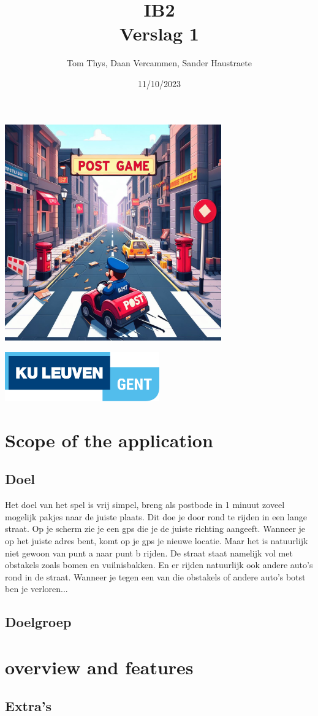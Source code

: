\documentclass{article}
\title{IB2\\
Verslag 1}
\date{11/10/2023}
\author{Tom Thys, Daan Vercammen, Sander Haustraete}
\begin{document}
\maketitle

\begin{minipage}{\textwidth}
    \centering
    \includegraphics[width=0.7\textwidth]{fotos/_a1a1db80-3fb5-41c9-9da6-cb8f494513cb.jpg}
\end{minipage}

\vspace{50pt}

\begin{minipage}{\textwidth}
    \centering
    \includegraphics[width=0.5\textwidth]{fotos/Logo.png}

\end{minipage}

\newpage
{}

\section{Scope of the application}
\subsection{Doel}
Het doel van het spel is vrij simpel, breng als postbode in 1 minuut zoveel mogelijk pakjes naar de juiste plaats. Dit doe je 
door rond te rijden in een lange straat. Op je scherm zie je een gps die je de juiste richting aangeeft. Wanneer je op het juiste adres
bent, komt op je gps je nieuwe locatie. Maar het is natuurlijk niet gewoon van punt a naar punt b rijden. De straat staat namelijk
vol met obstakels zoals bomen en vuilnisbakken. En er rijden natuurlijk ook andere auto's rond in de straat. Wanneer je tegen een van 
die obstakels of andere auto's botst ben je verloren... 
\subsection{Doelgroep}

\section{overview and features}
\subsection{Extra's}
\end{document}
